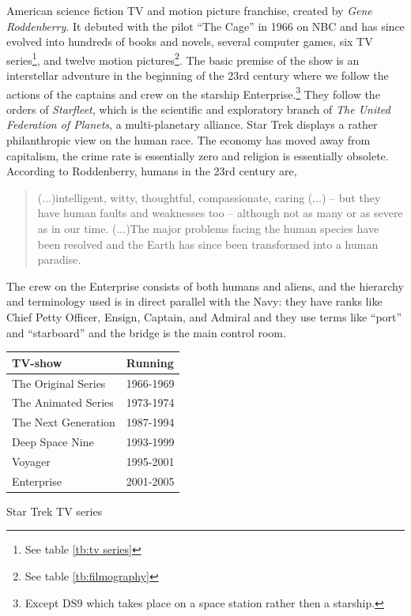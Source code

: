  American science fiction TV and motion picture franchise, created by \textit{Gene Roddenberry}. It debuted with the pilot ``The Cage'' in 1966 on NBC and has since evolved into hundreds of books and novels, several computer games, six TV series\footnote{See table \ref{tb:tv series}}, and twelve motion pictures\footnote{See table \ref{tb:filmography}}. The basic premise of the show is an interstellar adventure in the beginning of the 23rd century where we follow the actions of the captains and crew on the starship Enterprise.\footnote{Except DS9 which takes place on a space station rather then a starship.} They follow the orders of \textit{Starfleet}, which is the scientific and exploratory branch of \textit{The United Federation of Planets}, a multi-planetary alliance. Star Trek displays a rather philanthropic view on the human race. The economy has moved away from capitalism, the crime rate is essentially zero and religion is essentially obsolete. According to Roddenberry, humans in the 23rd century are,
\blockquote[{\cite{roddenberry_star_1987}}]
{
(...)intelligent, witty, thoughtful, compassionate, caring (...) -- but they have human faults and weaknesses too -- although not as many or as severe as in our time. (...)The major problems facing the human species have been resolved and the Earth has since been transformed into a human paradise.
}
The crew on the Enterprise consists of both humans and aliens, and the hierarchy and terminology used is in direct parallel with the Navy: they have ranks like Chief Petty Officer, Ensign, Captain, and Admiral and they use terms like ``port'' and ``starboard'' and the bridge is the main control room.

\begin{margintable}
\small
\begin{tabular}{ll}
\toprule
	\textbf{TV-show}		& \textbf{Running}	\\
\midrule
    	The Original Series		& 1966-1969		\\
        The Animated Series		& 1973-1974		\\
        The Next Generation 	& 1987-1994		\\
        Deep Space Nine 		& 1993-1999		\\
        Voyager					& 1995-2001		\\
        Enterprise				& 2001-2005		\\
\bottomrule
\end{tabular}
	\caption{Star Trek TV series}
	\label{tb:tv series}
\end{margintable}

